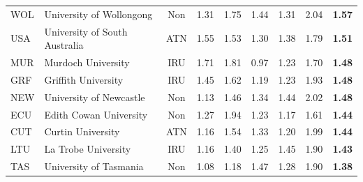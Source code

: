 \begin{table}[htbp]
\begin{tabularx}{\textwidth}{l >{\raggedright\arraybackslash}X c cccccc}
WOL & University of Wollongong & Non & 1.31 & 1.75 & 1.44 & 1.31 & 2.04 & \textbf{1.57} \\
USA & University of South Australia & ATN & 1.55 & 1.53 & 1.30 & 1.38 & 1.79 & \textbf{1.51} \\
MUR & Murdoch University & IRU & 1.71 & 1.81 & 0.97 & 1.23 & 1.70 & \textbf{1.48} \\
GRF & Griffith University & IRU & 1.45 & 1.62 & 1.19 & 1.23 & 1.93 & \textbf{1.48} \\
NEW & University of Newcastle & Non & 1.13 & 1.46 & 1.34 & 1.44 & 2.02 & \textbf{1.48} \\
ECU & Edith Cowan University & Non & 1.27 & 1.94 & 1.23 & 1.17 & 1.61 & \textbf{1.44} \\
CUT & Curtin University & ATN & 1.16 & 1.54 & 1.33 & 1.20 & 1.99 & \textbf{1.44} \\
LTU & La Trobe University & IRU & 1.16 & 1.40 & 1.25 & 1.45 & 1.90 & \textbf{1.43} \\
TAS & University of Tasmania & Non & 1.08 & 1.18 & 1.47 & 1.28 & 1.90 & \textbf{1.38} \\
\bottomrule
\end{tabularx}
\end{table}
